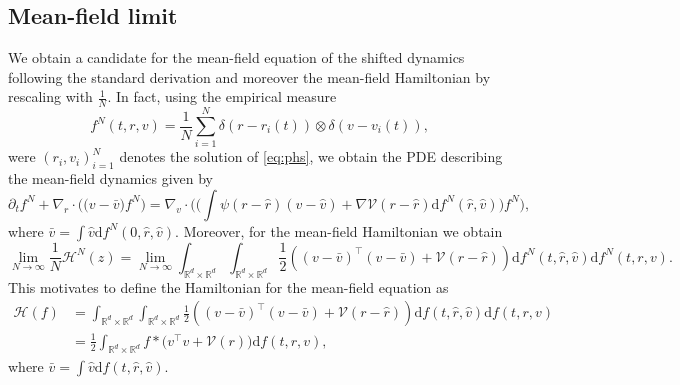 \documentclass[11pt]{article}
\newcommand{\R}[0]{\mathbb R}
\newcommand{\calH}[0]{\mathcal H}
\newcommand{\calV}[0]{\mathcal V}
\newcommand{\dd}[0]{\mathrm d}
\newcommand{\sumi}[0]{\sum_{i=1}^N}
\newcommand{\V}[0]{\mathcal V}
\begin{document}
\begin{bibunit}[abbrv]
\section{Mean-field limit}\label{sec:mean_field}
We obtain a candidate for the mean-field equation of the shifted dynamics following the standard derivation and moreover the mean-field Hamiltonian by rescaling with $\frac{1}{N}$. In fact, using the empirical measure $$f^N(t,r,v) = \frac{1}{N} \sumi \delta(r - r_i(t)) \otimes \delta(v-v_i(t)),$$ 
were $(r_i,v_i)_{i=1}^N$ denotes the solution of \eqref{eq:phs}, we obtain the PDE describing the mean-field dynamics given by
\begin{equation}\label{eq:evoFN}
\partial_t f^N + \nabla_r \cdot \Big( \big(v- \bar v  \big) f^N \Big) = \nabla_v \cdot \Big(\big( \int \psi(r- \hat r)(v- \hat v) + \nabla \calV(r - \hat r) \dd f^N(\hat r, \hat v) \big) f^N \Big),
\end{equation}
where $\bar v = \int \hat v \dd f^N(0, \hat r, \hat v)$. 
Moreover, for the mean-field Hamiltonian we obtain
\[\lim\limits_{N\rightarrow \infty} \frac{1}{N} \calH^N(z)  = \lim\limits_{N\rightarrow \infty} \int_{\mathbb R^d\times \mathbb R^d}\int_{\R^d \times \R^d} \frac{1}{2} \left(   (v-\bar v)^\top (v - \bar v) + \V(r-\hat r)\right) \dd f^N(t,\hat r,\hat v) \dd f^N(t,r,v).\]
%
This motivates to define the Hamiltonian for the mean-field equation as 
\begin{align*}\calH(f)  &=  \int_{\mathbb R^d\times \mathbb R^d}\int_{\R^d \times \R^d} \frac{1}{2} \left(    (v - \bar v)^\top (v - \bar v)  + \V(r-\hat r)\right) \dd f(t,\hat r,\hat v) \dd f(t,r,v) \\
&= \frac{1}{2}\int_{\mathbb R^d\times \mathbb R^d} f\ast \big(v^\top v + \mathcal V(r)\big) \dd f(t,r,v),
\end{align*}
where $\bar v = \int \hat v \dd f(t, \hat r, \hat v)$.


\end{bibunit}
\end{document}
